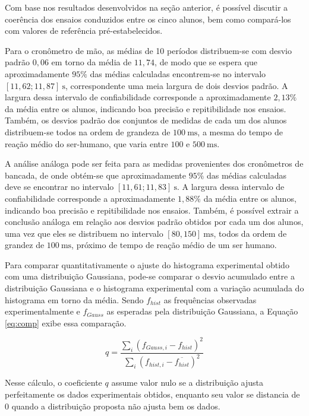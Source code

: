 \documentclass[12pt, a4paper, brazil]{article}
\begin{document}
Com base nos resultados desenvolvidos na seção anterior, é possível discutir a coerência dos ensaios conduzidos entre os cinco alunos, bem como compará-los com valores de referência pré-estabelecidos.

Para o cronômetro de mão, as médias de 10 períodos distribuem-se com desvio padrão $0,06$ em torno da média de $11,74$, de modo que se espera que aproximadamente $95\%$ das médias calculadas encontrem-se no intervalo $[11,62;11,87]\ \text{s}$, correspondente uma meia largura de dois desvios padrão\cite{vuolo2019}. A largura dessa intervalo de confiabilidade corresponde a aproximadamente $2,13\%$ da média entre os alunos, indicando boa precisão e repitibilidade nos ensaios. Também, os desvios padrão dos conjuntos de medidas de cada um dos alunos distribuem-se todos na ordem de grandeza de $100\ \text{ms}$, a mesma do tempo de reação médio do ser-humano, que varia entre $100$ e $500\ \text{ms}$.

A análise análoga pode ser feita para as medidas provenientes dos cronômetros de bancada, de onde obtém-se que aproximadamente $95\%$ das médias calculadas deve se encontrar no intervalo $[11,61; 11,83]\ \text{s}$. A largura dessa intervalo de confiabilidade corresponde a aproximadamente $1,88\%$ da média entre os alunos, indicando boa precisão e repitibilidade nos ensaios. Também, é possível extrair a conclusão análoga em relação aos desvios padrão obtidos por cada um dos alunos, uma vez que eles se distribuem no intervalo $[80, 150]\ \text{ms}$, todos da ordem de grandez de $100\ \text{ms}$, próximo de tempo de reação médio de um ser humano.


Para comparar quantitativamente o ajuste do histograma experimental obtido com uma distribuição Gaussiana, pode-se comparar o desvio acumulado entre a distribuição Gaussiana e o histograma experimental com a variação acumulada do histograma em torno da média. Sendo $f_{hist}$ as frequências observadas experimentalmente e $f_{Gauss}$ as esperadas pela distribuição Gaussiana, a Equação \ref{eq:comp} exibe essa comparação\cite{barrosneto2001}.

\begin{equation}\label{eq:comp}
	q = \frac{\sum_{i}(f_{Gauss,i}-{f_{hist}})^2}{\sum_{i}(f_{hist, i}-\overline{f_{hist}})^2}
\end{equation}

Nesse cálculo, o coeficiente $q$ assume valor nulo se a distribuição ajusta perfeitamente os dados experimentais obtidos, enquanto seu valor se distancia de $0$ quando a distribuição proposta não ajusta bem os dados.
\end{document}
